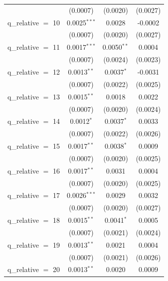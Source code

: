 \begin{tabular}{lccc}
                        & (0.0007)              & (0.0020)      & (0.0027)\\   
   q\_relative $=$ 10   & 0.0025$^{***}$        & 0.0028        & -0.0002\\   
                        & (0.0007)              & (0.0020)      & (0.0027)\\   
   q\_relative $=$ 11   & 0.0017$^{***}$        & 0.0050$^{**}$ & 0.0004\\   
                        & (0.0007)              & (0.0024)      & (0.0023)\\   
   q\_relative $=$ 12   & 0.0013$^{**}$         & 0.0037$^{*}$  & -0.0031\\   
                        & (0.0007)              & (0.0022)      & (0.0025)\\   
   q\_relative $=$ 13   & 0.0015$^{**}$         & 0.0018        & 0.0022\\   
                        & (0.0007)              & (0.0020)      & (0.0024)\\   
   q\_relative $=$ 14   & 0.0012$^{*}$          & 0.0037$^{*}$  & 0.0033\\   
                        & (0.0007)              & (0.0022)      & (0.0026)\\   
   q\_relative $=$ 15   & 0.0017$^{**}$         & 0.0038$^{*}$  & 0.0009\\   
                        & (0.0007)              & (0.0020)      & (0.0025)\\   
   q\_relative $=$ 16   & 0.0017$^{**}$         & 0.0031        & 0.0004\\   
                        & (0.0007)              & (0.0020)      & (0.0025)\\   
   q\_relative $=$ 17   & 0.0026$^{***}$        & 0.0029        & 0.0032\\   
                        & (0.0007)              & (0.0020)      & (0.0027)\\   
   q\_relative $=$ 18   & 0.0015$^{**}$         & 0.0041$^{*}$  & 0.0005\\   
                        & (0.0007)              & (0.0021)      & (0.0024)\\   
   q\_relative $=$ 19   & 0.0013$^{**}$         & 0.0021        & 0.0004\\   
                        & (0.0007)              & (0.0021)      & (0.0026)\\   
   q\_relative $=$ 20   & 0.0013$^{**}$         & 0.0020        & 0.0009\\   

\end{tabular}

